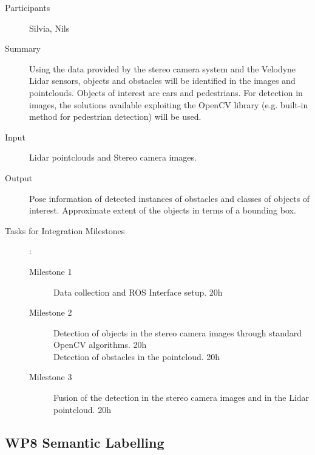 \documentclass[11pt,a4paper]{article}
\begin{document}
\begin{description}
\item[Participants] Silvia, Nils
\item[Summary]
	Using the data provided by the stereo camera system and the Velodyne Lidar sensors, objects and obstacles will be identified in the images and pointclouds. Objects of interest are cars and pedestrians. For detection in images, the solutions available exploiting the OpenCV library (e.g. built-in method for pedestrian detection) will be used. 
\item[Input]
	Lidar pointclouds and Stereo camera images.
\item[Output]
	Pose information of detected instances of obstacles and classes of objects of interest. Approximate extent of the objects in terms of a bounding box.
\item[Tasks for Integration Milestones]:\
	\begin{description}
		\item[Milestone 1]
			Data collection and ROS Interface setup. 20h
		\item[Milestone 2]
			Detection of objects in the stereo camera images through standard OpenCV algorithms. 20h \\
			
			Detection of obstacles in the pointcloud. 20h
		\item[Milestone 3]
			Fusion of the detection in the stereo camera images and in the Lidar pointcloud. 20h
	\end{description}	 
\end{description}

\subsection{WP8 Semantic Labelling} %
\end{document}
